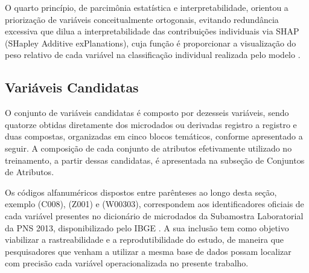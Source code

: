 O quarto princípio, de parcimônia estatística e interpretabilidade, orientou a priorização de variáveis conceitualmente ortogonais, evitando redundância excessiva que dilua a interpretabilidade das contribuições individuais via SHAP (SHapley Additive exPlanations), cuja função é proporcionar a visualização do peso relativo de cada variável na classificação individual realizada pelo modelo \cite{salih2025perspective}.

\subsection{Variáveis Candidatas}\label{sec:variaveis-candidatas}
O conjunto de variáveis candidatas é composto por dezesseis variáveis, sendo quatorze obtidas diretamente dos microdados ou derivadas registro a registro e duas compostas, organizadas em cinco blocos temáticos, conforme apresentado a seguir. A composição de cada conjunto de atributos efetivamente utilizado no treinamento, a partir dessas candidatas, é apresentada na subseção de Conjuntos de Atributos.

Os códigos alfanuméricos dispostos entre parênteses ao longo desta seção, exemplo (C008), (Z001) e (W00303), correspondem aos identificadores oficiais de cada variável presentes no dicionário de microdados da Subamostra Laboratorial da PNS 2013, disponibilizado pelo IBGE \cite{IBGE_PNS2013_Exames}. A sua inclusão tem como objetivo viabilizar a rastreabilidade e a reprodutibilidade do estudo, de maneira que pesquisadores que venham a utilizar a mesma base de dados possam localizar com precisão cada variável operacionalizada no presente trabalho.


